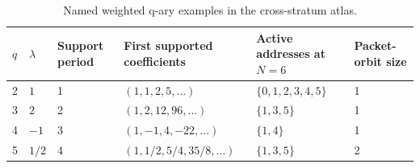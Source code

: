 \begin{table}[htbp]
\centering
\caption{Named weighted q-ary examples in the cross-stratum atlas.}
\label{tab:block13-qary-examples}
\scriptsize
\begin{tabularx}{\textwidth}{@{}L{0.10\textwidth}L{0.11\textwidth}L{0.12\textwidth}L{0.25\textwidth}L{0.17\textwidth}Y@{}}
\toprule
$q$ & $\lambda$ & Support period & First supported coefficients & Active addresses at $N=6$ & Packet-orbit size\\
 & $1$ & 1 & $(1, 1, 2, 5,\ldots)$ & $\{0,1,2,3,4,5\}$ & 1\\
3 & $2$ & 2 & $(1, 2, 12, 96,\ldots)$ & $\{1,3,5\}$ & 1\\
4 & $-1$ & 3 & $(1, -1, 4, -22,\ldots)$ & $\{1,4\}$ & 1\\
5 & $1/2$ & 4 & $(1, 1/2, 5/4, 35/8,\ldots)$ & $\{1,3,5\}$ & 2\\
\bottomrule
\end{tabularx}
\end{table}
